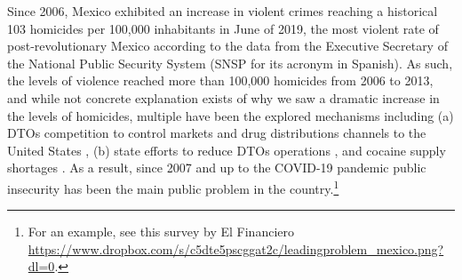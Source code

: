 \documentclass[12pt]{amsart}
\numberwithin{equation}{section}
\theoremstyle{definition}
\theoremstyle{definition}
\theoremstyle{definition}
\begin{document}
Since 2006, Mexico exhibited an increase in violent crimes reaching a historical 103 homicides per 100,000 inhabitants in June of 2019, the most violent rate of post-revolutionary Mexico according to the data from the Executive Secretary of the National Public Security System (SNSP for its acronym in Spanish). As such, the levels of violence reached more than 100,000 homicides from 2006 to 2013, and while not concrete explanation exists of why we saw a dramatic increase in the levels of homicides, multiple have been the explored mechanisms including (a) DTOs competition to control markets and drug distributions channels to the United States \citep{rios_2013, dell_2015}, (b) state efforts to reduce DTOs operations \citep{rios_2013}, and cocaine supply shortages \citep{castillo_etal_2018}. As a result, since 2007 and up to the COVID-19 pandemic public insecurity has been the main public problem in the country.\footnote{For an example, see this survey by El Financiero \url{https://www.dropbox.com/s/c5dte5pscggat2c/leadingproblem_mexico.png?dl=0}.} 
\end{document}
